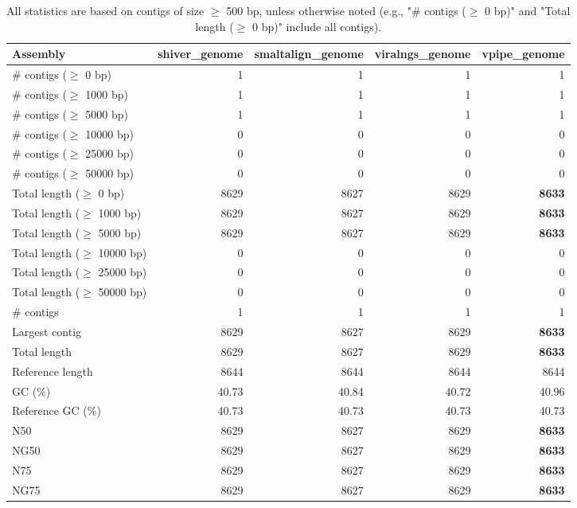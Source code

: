 \documentclass[12pt,a4paper]{article}
\begin{document}
\begin{table}[ht]
\begin{center}
\caption{All statistics are based on contigs of size $\geq$ 500 bp, unless otherwise noted (e.g., "\# contigs ($\geq$ 0 bp)" and "Total length ($\geq$ 0 bp)" include all contigs).}
\begin{tabular}{|l*{4}{|r}|}
\hline
Assembly & shiver\_genome & smaltalign\_genome & viralngs\_genome & vpipe\_genome \\ \hline
\# contigs ($\geq$ 0 bp) & 1 & 1 & 1 & 1 \\ \hline
\# contigs ($\geq$ 1000 bp) & 1 & 1 & 1 & 1 \\ \hline
\# contigs ($\geq$ 5000 bp) & 1 & 1 & 1 & 1 \\ \hline
\# contigs ($\geq$ 10000 bp) & 0 & 0 & 0 & 0 \\ \hline
\# contigs ($\geq$ 25000 bp) & 0 & 0 & 0 & 0 \\ \hline
\# contigs ($\geq$ 50000 bp) & 0 & 0 & 0 & 0 \\ \hline
Total length ($\geq$ 0 bp) & 8629 & 8627 & 8629 & {\bf 8633} \\ \hline
Total length ($\geq$ 1000 bp) & 8629 & 8627 & 8629 & {\bf 8633} \\ \hline
Total length ($\geq$ 5000 bp) & 8629 & 8627 & 8629 & {\bf 8633} \\ \hline
Total length ($\geq$ 10000 bp) & 0 & 0 & 0 & 0 \\ \hline
Total length ($\geq$ 25000 bp) & 0 & 0 & 0 & 0 \\ \hline
Total length ($\geq$ 50000 bp) & 0 & 0 & 0 & 0 \\ \hline
\# contigs & 1 & 1 & 1 & 1 \\ \hline
Largest contig & 8629 & 8627 & 8629 & {\bf 8633} \\ \hline
Total length & 8629 & 8627 & 8629 & {\bf 8633} \\ \hline
Reference length & 8644 & 8644 & 8644 & 8644 \\ \hline
GC (\%) & 40.73 & 40.84 & 40.72 & 40.96 \\ \hline
Reference GC (\%) & 40.73 & 40.73 & 40.73 & 40.73 \\ \hline
N50 & 8629 & 8627 & 8629 & {\bf 8633} \\ \hline
NG50 & 8629 & 8627 & 8629 & {\bf 8633} \\ \hline
N75 & 8629 & 8627 & 8629 & {\bf 8633} \\ \hline
NG75 & 8629 & 8627 & 8629 & {\bf 8633} \\ \hline

\end{tabular}
\end{center}
\end{table}
\end{document}
